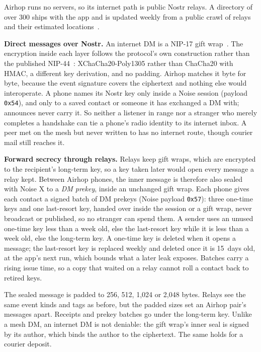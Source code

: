 \documentclass[conference]{IEEEtran}
\newcommand{\hx}[1]{\texttt{0x#1}}
\begin{document}
Airhop runs no servers, so its internet path is public Nostr relays. A directory of over 300 ships with the app and is updated weekly from a public crawl of relays and their estimated locations~\cite{georelays}.

\textbf{Direct messages over Nostr.} An internet DM is a NIP-17 gift wrap~\cite{nip17,nip59}. The encryption inside each layer follows the protocol's own construction rather than the published NIP-44~\cite{nip44}: XChaCha20-Poly1305 rather than ChaCha20 with HMAC, a different key derivation, and no padding. Airhop matches it byte for byte, because the event signature covers the ciphertext and nothing else would interoperate. A phone names its Nostr key only inside a Noise session (payload \hx{54}), and only to a saved contact or someone it has exchanged a DM with; announces never carry it. So neither a listener in range nor a stranger who merely completes a handshake can tie a phone's radio identity to its internet inbox. A peer met on the mesh but never written to has no internet route, though courier mail still reaches it.

\textbf{Forward secrecy through relays.} Relays keep gift wraps, which are encrypted to the recipient's long-term key, so a key taken later would open every message a relay kept. Between Airhop phones, the inner message is therefore also sealed with Noise X to a \emph{DM prekey}, inside an unchanged gift wrap. Each phone gives each contact a signed batch of DM prekeys (Noise payload \hx{57}): three one-time keys and one last-resort key, handed over inside the session or a gift wrap, never broadcast or published, so no stranger can spend them. A sender uses an unused one-time key less than a week old, else the last-resort key while it is less than a week old, else the long-term key. A one-time key is deleted when it opens a message; the last-resort key is replaced weekly and deleted once it is 15~days old, at the app's next run, which bounds what a later leak exposes. Batches carry a rising issue time, so a copy that waited on a relay cannot roll a contact back to retired keys.

The sealed message is padded to 256, 512, 1,024 or 2,048 bytes. Relays see the same event kinds and tags as before, but the padded sizes set an Airhop pair's messages apart. Receipts and prekey batches go under the long-term key. Unlike a mesh DM, an internet DM is not deniable: the gift wrap's inner seal is signed by its author, which binds the author to the ciphertext. The same holds for a courier deposit.
\end{document}
